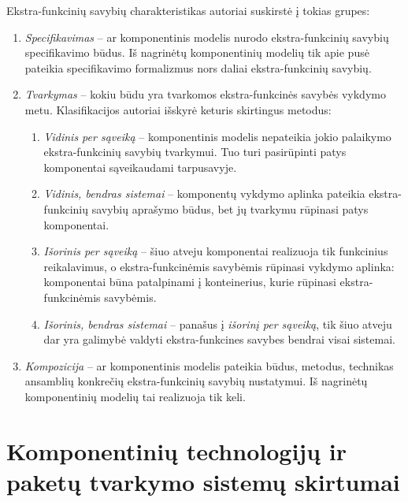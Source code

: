 Ekstra-funkcinių savybių charakteristikas autoriai suskirstė į tokias
grupes:
\begin{enumerate}
  \item \emph{Specifikavimas} – ar komponentinis modelis nurodo
    ekstra-funkcinių savybių specifikavimo būdus. Iš nagrinėtų
    komponentinių modelių tik apie pusė pateikia specifikavimo
    formalizmus nors daliai ekstra-funkcinių savybių.
  \item \emph{Tvarkymas} – kokiu būdu yra tvarkomos
    ekstra-funkcinės savybės vykdymo metu. Klasifikacijos autoriai
    išskyrė keturis skirtingus metodus:
    \begin{enumerate}
      \item \emph{Vidinis per sąveiką} 
        – komponentinis modelis nepateikia jokio palaikymo
        ekstra-funkcinių savybių tvarkymui. Tuo turi pasirūpinti
        patys komponentai sąveikaudami tarpusavyje.
      \item \emph{Vidinis, bendras sistemai} 
        – komponentų vykdymo aplinka pateikia ekstra-funkcinių
        savybių aprašymo būdus, bet jų tvarkymu rūpinasi patys
        komponentai.
      \item \emph{Išorinis per sąveiką} 
        – šiuo atveju komponentai realizuoja tik funkcinius reikalavimus,
        o ekstra-funkcinėmis savybėmis rūpinasi vykdymo aplinka:
        komponentai būna patalpinami į konteinerius, kurie rūpinasi
        ekstra-funkcinėmis savybėmis.
      \item \emph{Išorinis, bendras sistemai} 
        – panašus į \emph{išorinį per sąveiką}, tik šiuo atveju dar
        yra galimybė valdyti ekstra-funkcines savybes bendrai visai
        sistemai.
    \end{enumerate}
  \item \emph{Kompozicija} – ar komponentinis modelis pateikia būdus,
    metodus, technikas ansamblių konkrečių ekstra-funkcinių savybių
    nustatymui. Iš nagrinėtų komponentinių modelių tai realizuoja
    tik keli.
\end{enumerate}

\section{Komponentinių technologijų ir paketų tvarkymo sistemų skirtumai}


